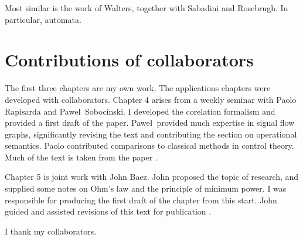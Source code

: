 Most similar is the work of Walters, together with Sabadini and Rosebrugh. In
particular, automata.

\section{Contributions of collaborators}

The first three chapters are my own work. The applications chapters were
developed with collaborators. Chapter 4 arises from a weekly seminar with Paolo
Rapisarda and Pawe\l\ Soboc\'inski. I developed the corelation formalism and provided a
first draft of the paper. Pawe\l\ provided much expertise in signal flow graphs,
significantly revising the text and contributing the section on operational
semantics. Paolo contributed comparisons to classical methods in control theory. 
Much of the text is taken from the paper \cite{FonRapSob16}.

Chapter 5 is joint work with John Baez. John proposed the topic of research, and
supplied some notes on Ohm's law and the principle of minimum power. I
was responsible for producing the first draft of the chapter from this start.
John guided and assisted revisions of this text for publication \cite{BaeFon16}.

I thank my collaborators.
